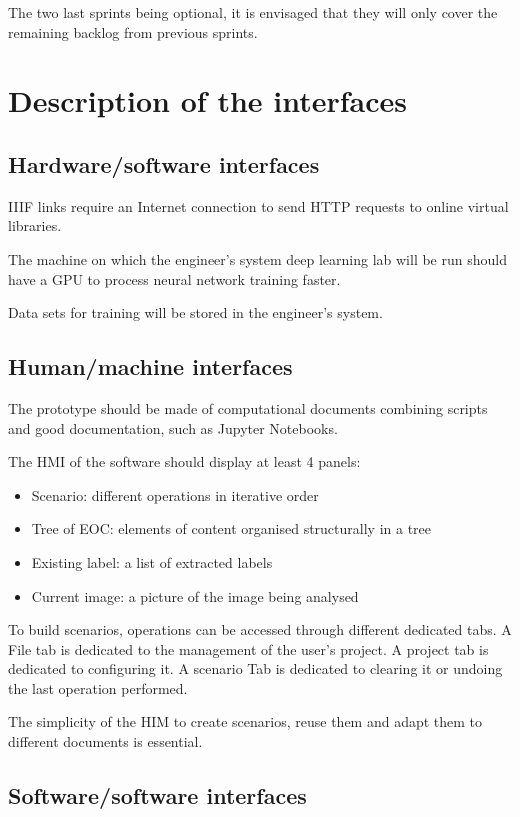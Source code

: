 \documentclass{polytech/polytech}
\numberwithin{figure}{chapter}
\begin{document}
\begin{appendix}
The two last sprints being optional, it is envisaged that they will only cover the remaining backlog from previous sprints.


\chapter{Description of the interfaces}

\section{Hardware/software interfaces}

IIIF links require an Internet connection to send HTTP requests to online virtual libraries.

The machine on which the engineer's system deep learning lab will be run should have a GPU to process neural network training faster.

Data sets for training will be stored in the engineer's system.


\section{Human/machine interfaces}

The prototype should be made of computational documents combining scripts and good documentation, such as Jupyter Notebooks.

The HMI of the software should display at least 4 panels:
\begin{itemize}
\item Scenario: different operations in iterative order
\item Tree of EOC: elements of content organised structurally in a tree
\item Existing label: a list of extracted labels
\item Current image: a picture of the image being analysed
\end{itemize}

To build scenarios, operations can be accessed through different dedicated tabs.
A File tab is dedicated to the management of the user's project.
A project tab is dedicated to configuring it.
A scenario Tab is dedicated to clearing it or undoing the last operation performed.

The simplicity of the HIM to create scenarios, reuse them and adapt them to different documents is essential.


\section{Software/software interfaces}


\end{appendix}
\end{document}
